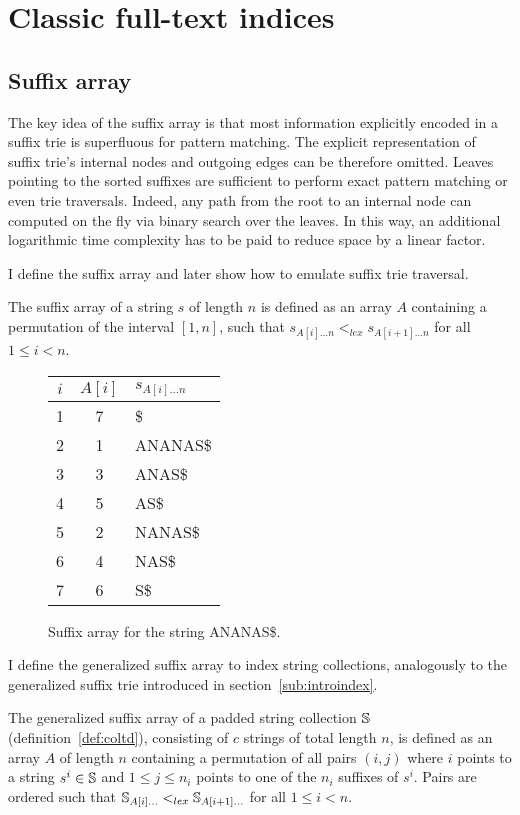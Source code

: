 \section{Classic full-text indices}

\subsection{Suffix array}

The key idea of the suffix array \citep{Manber1990} is that most information explicitly encoded in a suffix trie is superfluous for pattern matching.
The explicit representation of suffix trie's internal nodes and outgoing edges can be therefore omitted.
Leaves pointing to the sorted suffixes are sufficient to perform exact pattern matching or even trie traversals.
Indeed, any path from the root to an internal node can computed on the fly via binary search over the leaves.
In this way, an additional logarithmic time complexity has to be paid to reduce space by a linear factor.

I define the suffix array and later show how to emulate suffix trie traversal.
\begin{definition}
The suffix array of a string $s$ of length $n$ is defined as an array $A$ containing a permutation of the interval $[1,n]$, such that $s_{A[i] \dots n} <_{lex} s_{A[i+1] \dots n}$ for all $1 \leq i < n$.
\end{definition}

\begin{figure}[h]
\begin{center}
\caption[Example of suffix array]{Suffix array for the string {\ttfamily ANANAS\$}.}
\label{fig:sa}
\ttfamily
\begin{tabular}{ccl}
$i$ & $A[i]$ & $s_{A[i]\dots n}$\\
\midrule
1 & 7 & \$\\
2 & 1 & ANANAS\$\\
3 & 3 & ANAS\$\\
4 & 5 & AS\$\\
5 & 2 & NANAS\$\\
6 & 4 & NAS\$\\
7 & 6 & S\$\\
\end{tabular}
\end{center}
\end{figure}

I define the generalized suffix array to index string collections, analogously to the generalized suffix trie introduced in section~\ref{sub:introindex}.
\begin{definition}
The generalized suffix array of a padded string collection $\mathbb {S}$ (definition~\ref{def:coltd}), consisting of $c$ strings of total length $n$, is defined as an array $A$ of length $n$ containing a permutation of all pairs $(i,j)$ where $i$ points to a string $s^i \in \mathbb {S}$ and $1 \leq j \leq n_i$ points to one of the $n_i$ suffixes of $s^i$.
Pairs are ordered such that $\mathbb {S}_{A[i] \dots} <_{lex} \mathbb {S}_{A[i+1] \dots}$ for all $1 \leq i < n$.
\end{definition}

